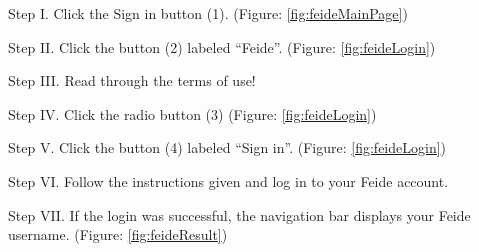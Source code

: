 \begin{userManualItemlist}
	\item[Step I.] Click the Sign in button (1). (Figure: \ref{fig:feideMainPage})
	\item[Step II.] Click the button (2) labeled “Feide”. (Figure: \ref{fig:feideLogin})
	\item[Step III.] Read through the terms of use!  
	\item[Step IV.] Click the radio button (3) (Figure: \ref{fig:feideLogin})
	\item[Step V.] Click the button (4) labeled “Sign in”. (Figure: \ref{fig:feideLogin}) 
	\item[Step VI.] Follow the instructions given and log in to your Feide account.
	\item[Step VII.] If the login was successful, the navigation bar displays your Feide username. (Figure: \ref{fig:feideResult})
\end{userManualItemlist}